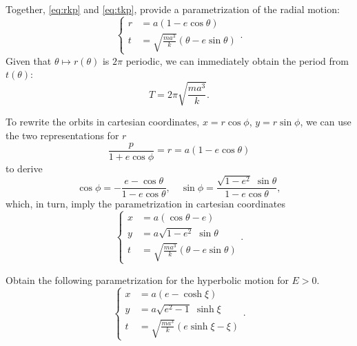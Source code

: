 \documentclass[english,fontsize=11pt,paper=a5,oneside]{scrbook}
\theoremstyle{definition}
\newenvironment{exercise}
  {\pushQED{\qed}\renewcommand{\qedsymbol}{$\maltese$}\exercisex}
  {\popQED\endexercisex}
\begin{document}
Together, \eqref{eq:rkp} and \eqref{eq:tkp}, provide a parametrization of the radial motion:
\begin{equation}
    \left\lbrace
    \begin{aligned}
        r &= a(1-e\cos\theta)\\
        t &= \sqrt{\frac{ma^3}k}(\theta - e\sin\theta)
    \end{aligned}
    \right..
\end{equation}
Given that $\theta\mapsto r(\theta)$ is $2\pi$ periodic, we can immediately obtain the period from $t(\theta)$:
\begin{equation}
    T = 2\pi \sqrt{\frac{ma^3}k}.
\end{equation}

To rewrite the orbits in cartesian coordinates, $x = r \cos\phi$, $y=r \sin\phi$, we can use the two representations for $r$
\begin{equation}
    \frac{p}{1+e\cos\phi} = r = a(1-e\cos\theta)
\end{equation}
to derive
\begin{equation}
    \cos\phi = -\frac{e - \cos\theta}{1-e \cos\theta},\quad
    \sin\phi = \frac{\sqrt{1-e^2}\;\sin\theta}{1-e\cos\theta},
\end{equation}
which, in turn, imply the parametrization in cartesian coordinates
\begin{equation}
    \left\lbrace
    \begin{aligned}
        x &= a(\cos\theta - e)\\
        y &= a\sqrt{1-e^2}\;\sin\theta\\
        t &= \sqrt{\frac{ma^3}k}(\theta - e\sin\theta)
    \end{aligned}
    \right..
\end{equation}

\begin{exercise}
    Obtain the following parametrization for the hyperbolic motion for $E>0$.
    \begin{equation}
        \left\lbrace
        \begin{aligned}
            x &= a(e- \cosh\xi)\\
            y &= a\sqrt{e^2-1}\;\sinh\xi\\
            t &= \sqrt{\frac{ma^3}k}(e\sinh\xi-\xi)
        \end{aligned}
        \right..
    \end{equation}
\end{exercise}
\end{document}
